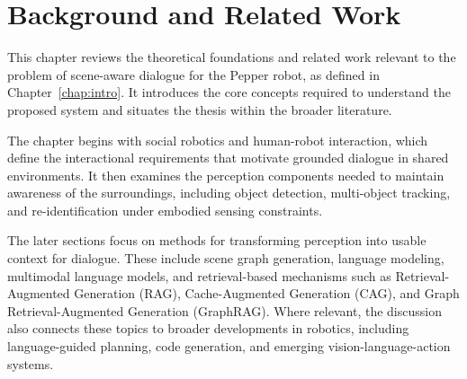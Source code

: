 \chapter{Background and Related Work}\label{chap:background}

This chapter reviews the theoretical foundations and related work relevant to the problem of scene-aware dialogue for the Pepper robot, as defined in Chapter~\ref{chap:intro}. It introduces the core concepts required to understand the proposed system and situates the thesis within the broader literature.

The chapter begins with social robotics and human-robot interaction, which define the interactional requirements that motivate grounded dialogue in shared environments. It then examines the perception components needed to maintain awareness of the surroundings, including object detection, multi-object tracking, and re-identification under embodied sensing constraints.

The later sections focus on methods for transforming perception into usable context for dialogue. These include scene graph generation, language modeling, multimodal language models, and retrieval-based mechanisms such as Retrieval-Augmented Generation (RAG), Cache-Augmented Generation (CAG), and Graph Retrieval-Augmented Generation (GraphRAG). Where relevant, the discussion also connects these topics to broader developments in robotics, including language-guided planning, code generation, and emerging vision-language-action systems.



